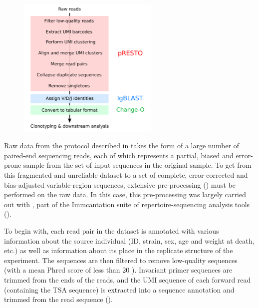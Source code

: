 \begin{figure}
\centering
\includegraphics[width=0.6\textwidth]{_Figures/png_edited/igseq-preprocessing}
\label{fig:igrace-preprocessing}
\vspace{0.5em}
\end{figure}

Raw \igseq data from the protocol described in  takes the form of a large number of paired-end sequencing reads, each of which represents a partial, biased and error-prone sample from the set of input sequences in the original sample. To get from this fragmented and unreliable dataset to a set of complete, error-corrected and bias-adjusted \igh{} variable-region sequences, extensive pre-processing () must be performed on the raw data. In this case, this pre-processing was largely carried out with  \parencite{vanderheiden2014presto}, part of the Immcantation suite of repertoire-sequencing analysis tools ().

To begin with, each read pair in the dataset is annotated with various information about the source individual (ID, strain, sex, age and weight at death, etc.) as well as information about its place in the replicate structure of the experiment. The sequences are then filtered to remove low-quality sequences (with a mean Phred score of less than 20 \parencite{ewing1998phred}). Invariant primer sequences are trimmed from the ends of the reads, and the UMI sequence of each forward read (containing the TSA sequence) is extracted into a sequence annotation and trimmed from the read sequence ().

